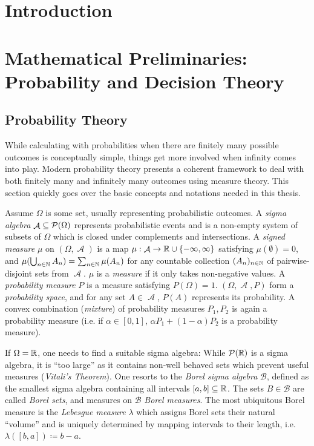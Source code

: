 \documentclass[a4paper]{scrreprt}
\DeclareMathOperator{\A}{\mathcal{A}}
\newcommand{\B}{\mathcal{B}}
\begin{document}
    \tableofcontents
    
    \chapter{Introduction}
    
    \chapter{Mathematical Preliminaries: Probability and Decision Theory}
    
    \section{Probability Theory}
    While calculating with probabilities when there are finitely many possible outcomes is conceptually simple, things get more involved when infinity comes into play.
    Modern probability theory presents a coherent framework to deal with both finitely many and infinitely many outcomes using measure theory. This section quickly goes over the basic concepts and notations needed in this thesis.
    
    Assume $\Omega$ is some set, usually representing probabilistic outcomes. 
    A \emph{sigma algebra} $\A \subseteq \Pot(\Omega)$ represents probabilistic events and is a non-empty system of subsets of $\Omega$ which is closed under complements and intersections.
    A \emph{signed measure} $\mu$ on $(\Omega, \A)$ is a map $\mu: \A \to \R \cup \set{-\infty, \infty}$ satisfying $\mu(\emptyset) = 0$, and $\mu(\bigcup_{n \in \mathbb{N}} A_n) = \sum_{n \in \mathbb{N}}\mu(A_n)$ for any countable collection $(A_n)_{n \in \mathbb{N}}$ of pairwise-disjoint sets from $\A$.
    $\mu$ is a \emph{measure} if it only takes non-negative values.
    A \emph{probability measure} $P$ is a measure satisfying $P(\Omega) = 1$.
    $(\Omega, \A, P)$ form a \emph{probability space}, and for any set $A \in \A$, $P(A)$ represents its probability.
    A convex combination (\emph{mixture}) of probability measures $P_1, P_2$ is again a probability measure (i.e. if $\alpha \in [0, 1]$, $\alpha P_1 + (1-\alpha) P_2$ is a probability measure).
    
    If $\Omega = \mathbb{R}$, one needs to find a suitable sigma algebra: While $\operatorname{\mathcal{P}}(\mathbb{R})$ is a sigma algebra, it is “too large” as it contains non-well behaved sets which prevent useful measures (\emph{Vitali's Theorem}).
    One resorts to the \emph{Borel sigma algebra} $\B$, defined as the smallest sigma algebra containing all intervals $[a, b] \subseteq \mathbb{R}$.
    The sets $B \in \B$ are called \emph{Borel sets}, and measures on $\B$ \emph{Borel measures}.
    The most ubiquitous Borel measure is the \emph{Lebesgue measure} $\lambda$ which assigns Borel sets their natural “volume” and is uniquely determined by mapping intervals to their length, i.e. $\lambda([b, a]) \coloneqq b-a$.
\end{document}
